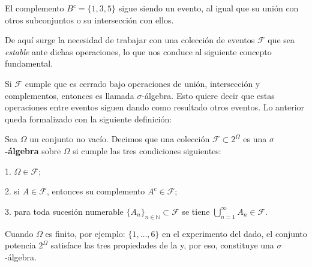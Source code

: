 \documentclass[../Main.tex]{subfiles}
\begin{document}
\begin{remark}
    El complemento \(B^{c}=\{1,3,5\}\) sigue siendo un evento, al igual que su unión con otros subconjuntos o su intersección con ellos.  
\end{remark}
De aquí surge la necesidad de trabajar con una colección de eventos \(\mathcal{F}\) que sea \emph{estable} ante dichas operaciones, lo que nos conduce al siguiente concepto fundamental.

Si $\mathcal{F}$ cumple que es cerrado bajo operaciones de unión, intersección y complementos, entonces es llamada $\sigma$-álgebra. Esto quiere decir que estas operaciones entre eventos siguen dando como resultado otros eventos. Lo anterior queda formalizado con la siguiente definición:

\begin{definition}
    Sea \(\Omega\) un conjunto no vacío. Decimos que una colección \(\mathcal{F}\subset 2^{\Omega}\) es una \textbf{\(\sigma\)-álgebra} sobre \(\Omega\) si cumple las tres condiciones siguientes:  

1. \(\Omega\in\mathcal{F}\);  

2. si \(A\in\mathcal{F}\), entonces su complemento \(A^{c}\in\mathcal{F}\);  

3. para toda sucesión numerable \(\{A_{n}\}_{n\in\mathbb{N}}\subset\mathcal{F}\) se tiene \(\displaystyle \bigcup_{n=1}^{\infty} A_{n}\in\mathcal{F}\).
\label{def:sigma-alg}
\end{definition}

Cuando \(\Omega\) es finito, por ejemplo: \(\{1,\dots,6\}\) en el experimento del dado, el conjunto potencia \(2^{\Omega}\) satisface las tres propiedades de la  y, por eso, constituye una \(\sigma\)-álgebra.


\end{document}
